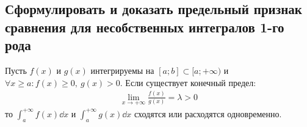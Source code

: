 \subsection{Сформулировать и доказать предельный признак сравнения для несобственных интегралов 1-го рода}

\begin{theorem}
    Пусть $f(x)$ и $g(x)$ интегрируемы на $[a;b] \subset [a; +\infty)$ и $\forall x \geqslant a\colon f(x) \geqslant 0,\ g(x) > 0$. Если существует конечный предел:
    \begin{gather}
        \lim\limits_{x \to +\infty} \frac{f(x)}{g(x)} = \lambda > 0
    \end{gather}
    то $\displaystyle\int_{a}^{+\infty} f(x)\dd{x}$ и $\displaystyle\int_{a}^{+\infty} g(x)\dd{x}$ сходятся или расходятся одновременно.
\end{theorem}
